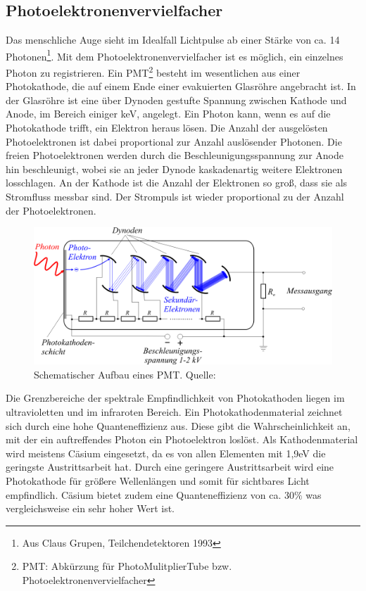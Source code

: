 \documentclass[12pt]{article}
\begin{document}
\subsection{Photoelektronenvervielfacher}
Das menschliche Auge sieht im Idealfall Lichtpulse ab einer Stärke von ca. 14 Photonen\footnote{Aus Claus Grupen, Teilchendetektoren 1993}. Mit dem Photoelektronenvervielfacher ist es möglich, ein einzelnes Photon zu registrieren. Ein PMT\footnote{PMT: Abkürzung für PhotoMulitplierTube bzw. Photoelektronenvervielfacher} besteht im wesentlichen aus einer Photokathode, die auf einem Ende einer evakuierten Glasröhre angebracht ist. In der Glasröhre ist eine über Dynoden gestufte Spannung zwischen Kathode und Anode, im Bereich einiger keV, angelegt. Ein Photon kann, wenn es auf die Photokathode trifft, ein Elektron heraus lösen. Die Anzahl der ausgelösten Photoelektronen ist dabei proportional zur Anzahl auslösender Photonen. Die freien Photoelektronen werden durch die Beschleunigungsspannung zur Anode hin beschleunigt, wobei sie an jeder Dynode kaskadenartig weitere Elektronen losschlagen. An der Kathode ist die Anzahl der Elektronen so groß, dass sie als Stromfluss messbar sind. Der Strompuls ist wieder proportional zu der Anzahl der Photoelektronen.
\begin{figure}[H]
\centering
\includegraphics[scale=1]{pics/Photomultiplier_schema_de.png}
\caption{Schematischer Aufbau eines PMT. Quelle: \cite{Jkrieger.}}
\end{figure}
Die Grenzbereiche der spektrale Empfindlichkeit von Photokathoden liegen im ultravioletten und im infraroten Bereich. Ein Photokathodenmaterial zeichnet sich durch eine hohe Quanteneffizienz aus. Diese gibt die Wahrscheinlichkeit an, mit der ein auftreffendes Photon ein Photoelektron loslöst. Als Kathodenmaterial wird meistens Cäsium eingesetzt, da es von allen Elementen mit 1,9eV die geringste Austrittsarbeit hat. Durch eine geringere Austrittsarbeit wird eine Photokathode für größere Wellenlängen und somit für sichtbares Licht empfindlich. Cäsium bietet zudem eine Quanteneffizienz von ca. 30$\%$ was vergleichsweise ein sehr hoher Wert ist.
\end{document}
